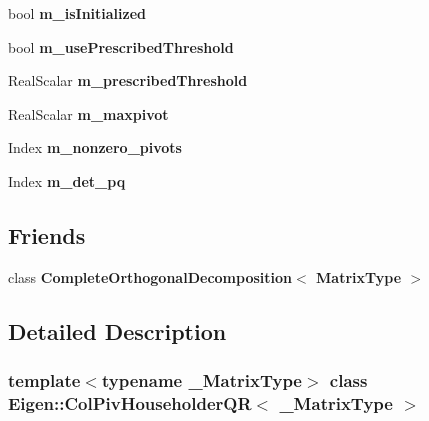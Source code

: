 \begin{DoxyCompactItemize}
bool {\bfseries m\+\_\+is\+Initialized}
\item 
\mbox{\label{class_eigen_1_1_col_piv_householder_q_r_ad155de2c03a65d9be81a9174efe6e43a}} 
bool {\bfseries m\+\_\+use\+Prescribed\+Threshold}
\item 
\mbox{\label{class_eigen_1_1_col_piv_householder_q_r_a9a4f85e7fb5dbb8d46781550f567e1fc}} 
Real\+Scalar {\bfseries m\+\_\+prescribed\+Threshold}
\item 
\mbox{\label{class_eigen_1_1_col_piv_householder_q_r_a65f1f2cae0c047868da485c8db81f1a3}} 
Real\+Scalar {\bfseries m\+\_\+maxpivot}
\item 
\mbox{\label{class_eigen_1_1_col_piv_householder_q_r_ab99a6c9cc74ca1441d955605cccad919}} 
Index {\bfseries m\+\_\+nonzero\+\_\+pivots}
\item 
\mbox{\label{class_eigen_1_1_col_piv_householder_q_r_a43597f3b3ae67cc05edac305ef24dad7}} 
Index {\bfseries m\+\_\+det\+\_\+pq}
\end{DoxyCompactItemize}
\subsection*{Friends}
\begin{DoxyCompactItemize}
\item 
\mbox{\label{class_eigen_1_1_col_piv_householder_q_r_a6c741054e65697365ce75f1bbec5802b}} 
class {\bfseries Complete\+Orthogonal\+Decomposition$<$ Matrix\+Type $>$}
\end{DoxyCompactItemize}


\subsection{Detailed Description}
\subsubsection*{template$<$typename \+\_\+\+Matrix\+Type$>$\newline
class Eigen\+::\+Col\+Piv\+Householder\+Q\+R$<$ \+\_\+\+Matrix\+Type $>$}

